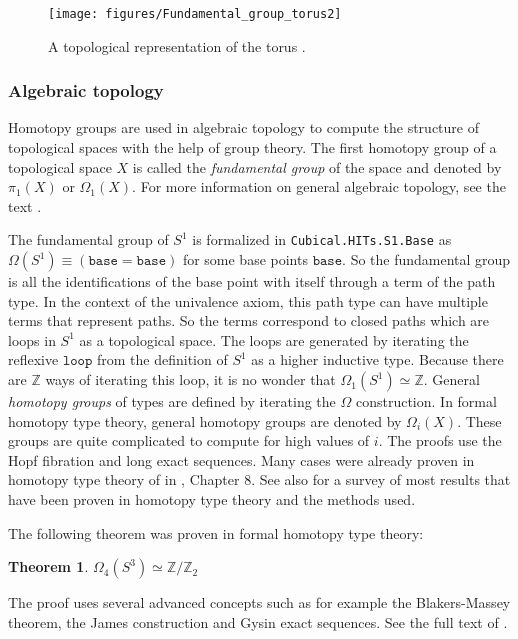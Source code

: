 \documentclass[12pt,a4paper,twoside,xetex]{book}
\newcommand{\keyword}[1]{\emph{#1}\index{#1}}
\newtheorem{theorem}{Theorem}[section]
\newcommand{\op}[1]{\mathtt{#1}}
\begin{document}
\begin{figure}
\centering
\texttt{[image: figures/Fundamental\_group\_torus2]}
\caption{A topological representation of the torus \cite{Dinkelbach2005}. \label{torus}}
\end{figure}

\subsubsection{Algebraic topology}\label{higherhomotopy}

Homotopy groups are used in algebraic topology to compute the structure of topological spaces with the help of group theory.  The first homotopy group of a topological space $X$ is called the \keyword{fundamental group} of the space and denoted by $\pi_1 (X)$ or $\Omega_1 (X)$. For more information on general algebraic topology, see the text \cite{Hatcher2001}.

The fundamental group of $S^1$ is formalized in \texttt{Cubical.HITs.S1.Base} as $\Omega (S^1) \equiv (\op{base} = \op{base})$ for some base points $\op{base}$. So the fundamental group is all the identifications of the base point with itself through a term of the path type. In the context of the univalence axiom, this path type can have multiple terms that represent paths. So the terms correspond to closed paths which are loops in $S^1$ as a topological space. The loops are generated by iterating the reflexive $\op{loop}$ from the definition of $S^1$ as a higher inductive type. Because there are $\mathbb{Z}$ ways of iterating this loop, it is no wonder that $\Omega_1 (S^1) \simeq \mathbb{Z}$. General \keyword{homotopy groups} of types are defined by iterating the $\Omega$ construction. In formal homotopy type theory, general homotopy groups are denoted by $\Omega_i (X)$. These groups are quite complicated to compute for high values of $i$. The proofs use the Hopf fibration and long exact sequences. Many cases were already proven in homotopy type theory of in \cite{Voevodsky2013}, Chapter 8. See also \cite{Licata2013May} for a survey of most results that have been proven in homotopy type theory and the methods used.



The following theorem was proven in formal homotopy type theory:

\begin{theorem}
$\Omega_4 ( S^3 ) \simeq \mathbb{Z} / \mathbb{Z}_2$
\end{theorem}

The proof uses several advanced concepts such as for example the Blakers-Massey theorem, the James construction and Gysin exact sequences. See the full text of \cite{Brunerie2016}.
\end{document}
